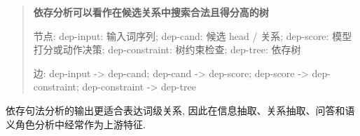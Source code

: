 \begin{quote}
\small
\textbf{依存分析可以看作在候选关系中搜索合法且得分高的树}
\par 节点: dep-input: 输入词序列; dep-cand: 候选 head / 关系; dep-score: 模型打分或动作决策; dep-constraint: 树约束检查; dep-tree: 依存树
\par 边: dep-input -\textgreater{} dep-cand; dep-cand -\textgreater{} dep-score; dep-score -\textgreater{} dep-constraint; dep-constraint -\textgreater{} dep-tree
\end{quote}

依存句法分析的输出更适合表达词级关系,
因此在信息抽取、关系抽取、问答和语义角色分析中经常作为上游特征.
